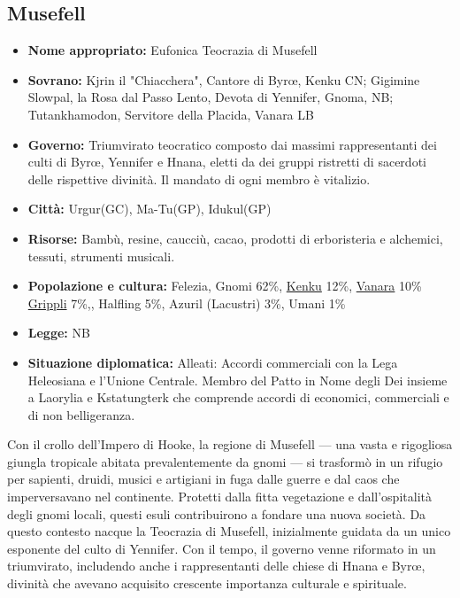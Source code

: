 \documentclass[10pt, a4paper]{report}
\begin{document}
\begin{multicols}{2}
\subsection*{Musefell}
\begin{itemize}
	\item \textbf{Nome appropriato:} Eufonica Teocrazia di Musefell
	\item \textbf{Sovrano:} Kjrin il "Chiacchera", Cantore di Byrœ, Kenku CN; Gigimine Slowpal, la Rosa dal Passo Lento, Devota di Yennifer, Gnoma, NB; Tutankhamodon, Servitore della Placida, Vanara LB
	\item \textbf{Governo:} Triumvirato teocratico composto dai massimi rappresentanti dei culti di Byrœ, Yennifer e Hnana, eletti da dei gruppi ristretti di sacerdoti delle rispettive divinità. Il mandato di ogni membro è vitalizio. 
	\item \textbf{Città:} Urgur(GC), Ma-Tu(GP), Idukul(GP)
	\item \textbf{Risorse:} Bambù, resine, caucciù, cacao, prodotti di erboristeria e alchemici, tessuti, strumenti musicali.
	\item \textbf{Popolazione e cultura:} Felezia, Gnomi 62\%, \href{https://srd.dndtools.org/srd/races/racesMm3.html#kenkus}{Kenku} 12\%,  \href{https://srd.dndtools.org/srd/races/racesOa.html#vanaras}{Vanara} 10\% \href{https://srd.dndtools.org/srd/races/racesDramag.html#grippli}{Grippli} 7\%,, Halfling 5\%, Azuril (Lacustri) 3\%, Umani 1\%
	\item \textbf{Legge:} NB
	\item \textbf{Situazione diplomatica:} Alleati: Accordi commerciali con la Lega Heleosiana e l'Unione Centrale.  Membro del Patto in Nome degli Dei insieme a Laorylia e Kstatungterk che comprende accordi di economici, commerciali e di non belligeranza.
\end{itemize}
Con il crollo dell’Impero di Hooke, la regione di Musefell — una vasta e rigogliosa giungla tropicale abitata prevalentemente da gnomi — si trasformò in un rifugio per sapienti, druidi, musici e artigiani in fuga dalle guerre e dal caos che imperversavano nel continente. Protetti dalla fitta vegetazione e dall'ospitalità degli gnomi locali, questi esuli contribuirono a fondare una nuova società. Da questo contesto nacque la Teocrazia di Musefell, inizialmente guidata da un unico esponente del culto di Yennifer. Con il tempo, il governo venne riformato in un triumvirato, includendo anche i rappresentanti delle chiese di Hnana e Byrœ, divinità che avevano acquisito crescente importanza culturale e spirituale.

\end{multicols}
\end{document}

